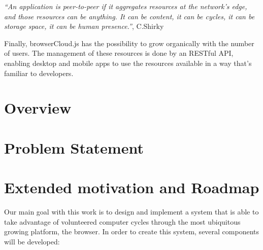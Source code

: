   \textit{``An application is peer-to-peer if it aggregates resources at the network’s edge, and those resources can be anything. It can be content, it can be cycles, it can be storage space, it can be human presence.''}, C.Shirky \cite{Shirky.}

Finally, browserCloud.js has the possibility to grow organically with the number of users. The management of these resources is done by an RESTful API, enabling desktop and mobile apps to use the resources available in a way that's familiar to developers. 

\section{Overview}


\section{Problem Statement}


\section{Extended motivation and Roadmap}

Our main goal with this work is to design and implement a system that is able to take advantage of volunteered computer cycles through the most ubiquitous growing platform, the browser. In order to create this system, several components will be developed:

